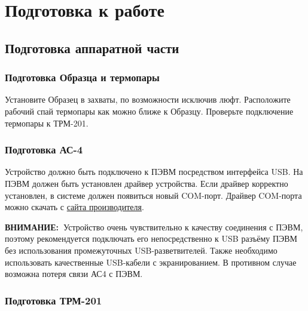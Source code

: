 \documentclass[12pt, a4paper, twocolumn]{book}
\newcommand{\IMPORTANT}{{\bf ВНИМАНИЕ:~}}
\begin{document}
\chapter{Подготовка к работе}

\section{Подготовка аппаратной части}

\subsection{Подготовка Образца и термопары}

Установите Образец в захваты, по возможности исключив люфт. Расположите рабочий спай термопары как можно ближе к Образцу. Проверьте подключение термопары к ТРМ-201.

\subsection{Подготовка АС-4}

Устройство должно быть подключено к ПЭВМ посредством интерфейса USB. На ПЭВМ должен быть установлен драйвер устройства. Если драйвер корректно установлен, в системе должен появиться новый COM-порт. Драйвер COM-порта можно скачать с \href{http://www.owen.ru/catalog/avtomaticheskij_preobrazovatel_interfejsov_usb_rs_485_owen_as4/opisanie}{сайта производителя}.

\IMPORTANT Устройство очень чувствительно к качеству соединения с ПЭВМ, поэтому рекомендуется подключать его непосредственно к USB разъёму ПЭВМ без использования промежуточных USB-разветвителей. Также необходимо использовать качественные USB-кабели с экранированием. В противном случае возможна потеря связи АС4 с ПЭВМ.

\subsection{Подготовка ТРМ-201}
\end{document}
